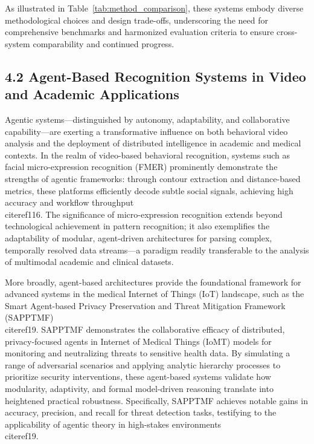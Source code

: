 \documentclass[11pt]{article}
\begin{document}
As illustrated in Table~\ref{tab:method_comparison}, these systems embody diverse methodological choices and design trade-offs, underscoring the need for comprehensive benchmarks and harmonized evaluation criteria to ensure cross-system comparability and continued progress.

\subsection{4.2 Agent-Based Recognition Systems in Video and Academic Applications}

Agentic systems—distinguished by autonomy, adaptability, and collaborative capability—are exerting a transformative influence on both behavioral video analysis and the deployment of distributed intelligence in academic and medical contexts. In the realm of video-based behavioral recognition, systems such as facial micro-expression recognition (FMER) prominently demonstrate the strengths of agentic frameworks: through contour extraction and distance-based metrics, these platforms efficiently decode subtle social signals, achieving high accuracy and workflow throughput \\cite{ref116}. The significance of micro-expression recognition extends beyond technological achievement in pattern recognition; it also exemplifies the adaptability of modular, agent-driven architectures for parsing complex, temporally resolved data streams—a paradigm readily transferable to the analysis of multimodal academic and clinical datasets.

More broadly, agent-based architectures provide the foundational framework for advanced systems in the medical Internet of Things (IoT) landscape, such as the Smart Agent-based Privacy Preservation and Threat Mitigation Framework (SAPPTMF) \\cite{ref19}. SAPPTMF demonstrates the collaborative efficacy of distributed, privacy-focused agents in Internet of Medical Things (IoMT) models for monitoring and neutralizing threats to sensitive health data. By simulating a range of adversarial scenarios and applying analytic hierarchy processes to prioritize security interventions, these agent-based systems validate how modularity, adaptivity, and formal model-driven reasoning translate into heightened practical robustness. Specifically, SAPPTMF achieves notable gains in accuracy, precision, and recall for threat detection tasks, testifying to the applicability of agentic theory in high-stakes environments \\cite{ref19}.
\end{document}
